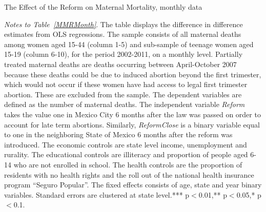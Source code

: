 \documentclass[a4paper, 11pt]{article}
\begin{document}
\begin{spacing}{1.4}
\begin{table}
\end{table}

\begin{table}\caption{The Effect of the Reform on Maternal Mortality, monthly data} \label{MMRMonth}
	
\begin{threeparttable}
		
{\footnotesize  }
		
\begin{tablenotes}
			
\footnotesize
			
\item \textit{Notes to Table~\ref{MMRMonth}}. The table displays the difference in difference estimates from OLS regressions. The sample consists of all maternal deaths among women aged 15-44 (column 1-5) and sub-sample of teenage women aged 15-19 (column 6-10), for the period 2002-2011, on a monthly level. Partially treated maternal deaths are deaths occurring between April-October 2007 because these deaths could be due to induced abortion beyond the first trimester, which would not occur if these women have had access to legal first trimester abortion. These are excluded from the sample. The dependent variables are defined as the number of maternal deaths. The independent variable \textit{Reform} takes the value one in Mexico City 6 months after the law was passed on order to account for late term abortions. Similarly, \textit{ReformClose} is a binary variable equal to one in the neighboring State of Mexico 6 months after the reform was introduced. The economic controls are state level income, unemployment and rurality. The educational controls are illiteracy and proportion of people aged 6-14 who are not enrolled in school. The health controls are the proportion of residents with no health rights and the roll out of the national health insurance program ``Seguro Popular''. The fixed effects consists of age, state and year binary variables. Standard errors are clustered at state level.*** p$<$0.01,** p$<$0.05,* p$<$0.1.
 
			
\end{tablenotes} 
		
\end{threeparttable}
	
\end{table}

 

\end{spacing}
\end{document}
